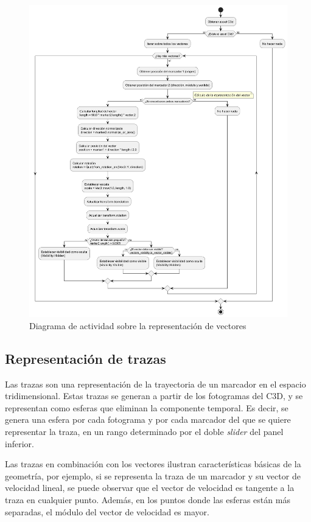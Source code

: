 \begin{figure}[H]
  \centering
  \includegraphics[width=\textwidth]{imagenes/diagramas/vectores.png}
  \caption{Diagrama de actividad sobre la representación de vectores}
  \label{fig:diag-vectores}
\end{figure}

\subsection{Representación de trazas} \label{sec:representacion-trazas}

Las trazas son una representación de la trayectoria de un marcador en el espacio tridimensional. Estas trazas se generan a partir de los fotogramas del \ac{C3D}, y se representan como esferas que eliminan la componente temporal. Es decir, se genera una esfera por cada fotograma y por cada marcador del que se quiere representar la traza, en un rango determinado por el doble \textit{slider} del panel inferior. 

Las trazas en combinación con los vectores ilustran características básicas de la geometría, por ejemplo, si se representa la traza de un marcador y su vector de velocidad lineal, se puede observar que el vector de velocidad es tangente a la traza en cualquier punto. Además, en los puntos donde las esferas están más separadas, el módulo del vector de velocidad es mayor.

